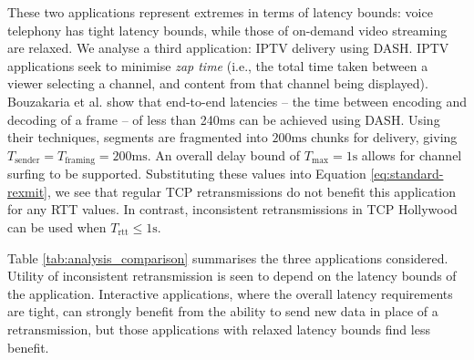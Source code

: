These two applications represent extremes in
terms of latency bounds: voice telephony has tight latency bounds, while
those of on-demand video streaming are relaxed. We analyse a third
application: IPTV delivery using DASH. IPTV applications seek to minimise
\textit{zap time} (i.e., the total time taken between a viewer selecting
a channel, and content from that channel being displayed). Bouzakaria
et al. \cite{bouzakaria:2014:overhead} show that end-to-end latencies --
the time between encoding and decoding of a frame -- of less than 240ms
can be achieved using DASH. Using their techniques, segments are fragmented
into $200\mathrm{ms}$ chunks for delivery, giving
$T_\mathrm{sender} = T_\mathrm{framing} = 200\mathrm{ms}$. An overall delay
bound of $T_\mathrm{max} = 1\mathrm{s}$ allows for channel surfing to be
supported. Substituting these values into Equation \ref{eq:standard-rexmit},
we see that regular TCP retransmissions do not benefit this application for
any RTT values. In contrast, inconsistent retransmissions in TCP Hollywood can
be used when $T_\mathrm{rtt} \leq 1\mathrm{s}$.

Table \ref{tab:analysis_comparison} summarises the three applications considered.
Utility of inconsistent retransmission is seen to depend on
the latency bounds of the application. Interactive applications, where
the overall latency requirements are tight, can strongly benefit from
the ability to send new data in place of a retransmission, but those
applications with relaxed latency bounds find less benefit.

